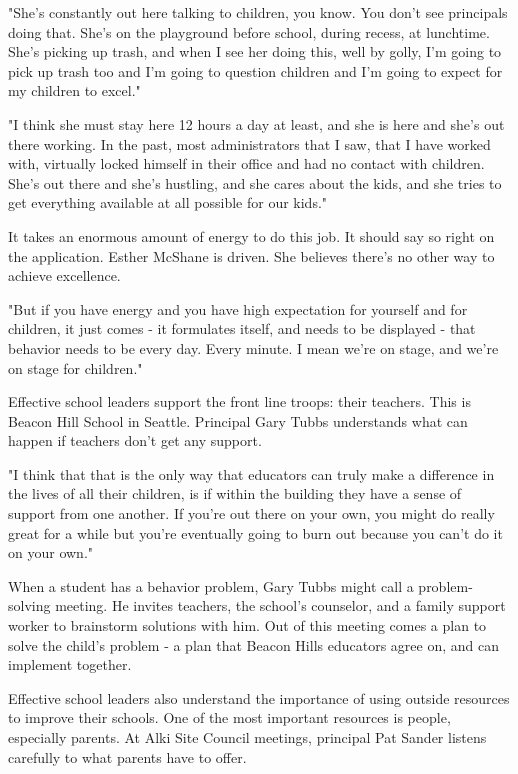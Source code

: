 "She's constantly out here talking to children, you know. You don't see principals doing that. She's on the playground before school, during recess, at lunchtime. She's picking up trash, and when I see her doing this, well by golly, I'm going to pick up trash too and I'm going to question children and I'm going to expect for my children to excel."

"I think she must stay here 12 hours a day at least, and she is here and she's out there working. In the past, most administrators that I saw, that I have worked with, virtually locked himself in their office and had no contact with children. She's out there and she's hustling, and she cares about the kids, and she tries to get everything available at all possible for our kids."

It takes an enormous amount of energy to do this job. It should say so right on the application. Esther McShane is driven. She believes there's no other way to achieve excellence.

"But if you have energy and you have high expectation for yourself and for children, it just comes - it formulates itself, and needs to be displayed -  that behavior needs to be every day. Every minute. I mean we're on stage, and we're on stage for children."

Effective school leaders support the front line troops: their teachers. This is Beacon Hill School in Seattle. Principal Gary Tubbs understands what can happen if teachers don't get any support.

"I think that that is the only way that educators can truly make a difference in the lives of all their children, is if within the building they have a sense of support from one another. If you're out there on your own, you might do really great for a while but you're eventually going to burn out because you can't do it on your own."

When a student has a behavior problem, Gary Tubbs might call a problem-solving meeting. He invites teachers, the school's counselor, and a family support worker to brainstorm solutions with him. Out of this meeting comes a plan to solve the child's problem - a plan that Beacon Hills educators agree on, and can implement together.

Effective school leaders also understand the importance of using outside resources to improve their schools. One of the most important resources is people, especially parents. At Alki Site Council meetings, principal Pat Sander listens carefully to what parents have to offer.

